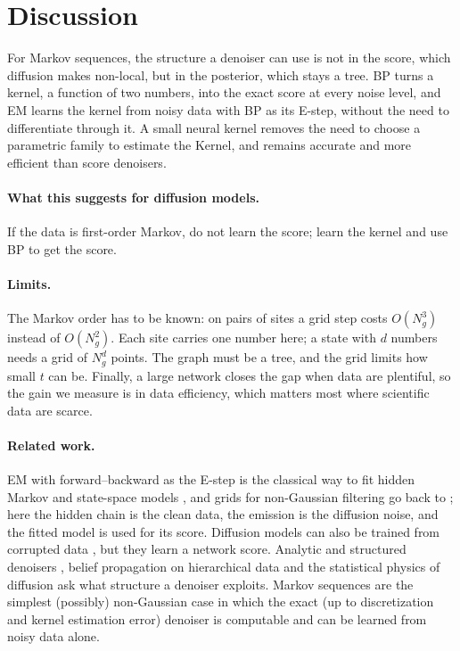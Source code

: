\section{Discussion}
\label{sec:discussion}

For Markov sequences, the structure a denoiser can use is not in the score, which diffusion makes non-local, but in the
posterior, which stays a tree. BP turns a kernel, a function of two numbers, into the exact score at every noise level,
and EM learns the kernel from noisy data with BP as its E-step, without the need to differentiate through it. A small neural
kernel removes the need to choose a parametric family to estimate the Kernel, and remains accurate and more efficient than score denoisers.

\paragraph{What this suggests for diffusion models.} If the data is first-order Markov, do not learn the score; learn the kernel and use BP to get the score.

\paragraph{Limits.} The Markov order has to be known: on pairs of sites a grid step costs $O(N_g^3)$ instead of
$O(N_g^2)$. Each site carries one number here; a state with $d$ numbers needs a grid of $N_g^d$ points. The graph must be
a tree, and the grid limits how small $t$ can be. Finally, a large network closes the gap when data are plentiful, so the
gain we measure is in data efficiency, which matters most where scientific data are scarce.

\paragraph{Related work.} EM with forward--backward as the E-step is the classical way to fit hidden Markov and
state-space models \cite{baum1970,rabiner1989tutorial,shumway1982em,cappe2005}, and grids for non-Gaussian filtering go
back to \cite{kitagawa1987}; here the hidden chain is the clean data, the emission is the diffusion noise, and the
fitted model is used for its score. Diffusion models can also be trained from corrupted data
\cite{daras2023ambient,rozet2024learning,bai2024em}, but they learn a network score. Analytic and structured denoisers
\cite{kamb2024analytic,kadkhodaie2024generalization}, belief propagation on hierarchical data
\cite{garnierbrun2024transformers,sclocchi2025phase,mei2024unets} and the statistical physics of diffusion
\cite{biroli2023generative,biroli2024dynamical,achilli2025memorization,bonnaire2025memorize,garnierbrun2026biased,garnierbrun2026foam}
ask what structure a denoiser exploits. Markov sequences are the simplest (possibly) non-Gaussian case in which the exact (up to discretization and kernel estimation error) denoiser
is computable and can be learned from noisy data alone.
